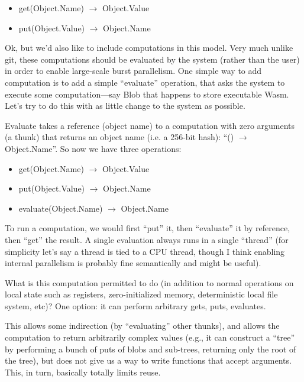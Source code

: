 \documentclass{article}
\newcommand{\bs}{\vspace{\baselineskip}}
\begin{document}
\begin{itemize}
\item    get(Object.Name) $\rightarrow$ Object.Value
\item    put(Object.Value) $\rightarrow$ Object.Name
\end{itemize}
    
Ok, but we'd also like to include computations in this model. Very
much unlike git, these computations should be evaluated by the system
(rather than the user) in order to enable large-scale burst
parallelism. One simple way to add computation is to add a simple
``evaluate'' operation, that asks the system to execute some
computation---say Blob that happens to store executable Wasm. Let's
try to do this with as little change to the system as possible.

\bs

Evaluate takes a reference (object name) to a computation with zero
arguments (a thunk) that returns an object name (i.e. a 256-bit hash):
``() $\rightarrow$ Object.Name''. So now we have three operations:

\begin{itemize}
\item    get(Object.Name) $\rightarrow$ Object.Value
\item    put(Object.Value) $\rightarrow$ Object.Name
\item    evaluate(Object.Name) $\rightarrow$ Object.Name
\end{itemize}
  
To run a computation, we would first ``put'' it, then ``evaluate'' it
by reference, then ``get'' the result. A single evaluation always runs
in a single ``thread'' (for simplicity let's say a thread is tied to a
CPU thread, though I think enabling internal parallelism is probably
fine semantically and might be useful).

\bs

What is this computation permitted to do (in addition to normal
operations on local state such as registers, zero-initialized memory,
deterministic local file system, etc)? One option: it can perform
arbitrary gets, puts, evaluates.

\bs

This allows some indirection (by ``evaluating'' other thunks), and
allows the computation to return arbitrarily complex values (e.g., it
can construct a ``tree'' by performing a bunch of puts of blobs and
sub-trees, returning only the root of the tree), but does not give us
a way to write functions that accept arguments. This, in turn,
basically totally limits reuse.
\end{document}
